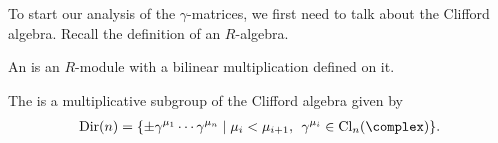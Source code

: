 \documentclass[11pt]{article}
\begin{document}
To start our analysis of the $\gamma$-matrices, we first need to talk 
about the Clifford algebra. Recall the definition of an $R$-algebra.

\begin{definition}
    An  is an $R$-module with a bilinear multiplication
    defined on it.
\end{definition}

\begin{definition}
\end{definition}

\begin{definition}
    The  is a multiplicative subgroup of the Clifford algebra
    given by 
    \begin{align*}
        {\rm Dir}(n) = \{ \pm \gamma^{\mu_1} \cdots \gamma^{\mu_n} \mid \mu_i < \mu_{i + 1}, \: \: \gamma^{\mu_i} \in \operatorname{Cl}_n(\complex) \}.
    \end{align*}
\end{definition}
\end{document}
